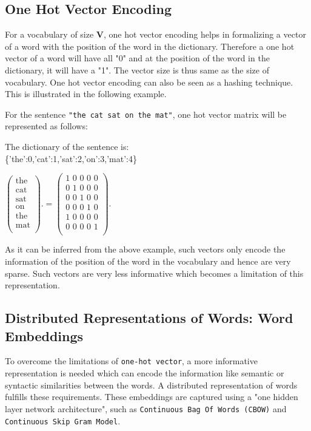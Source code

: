 \subsection{One Hot Vector Encoding}
For a vocabulary of size $\mathbf{V}$, one hot vector encoding helps in formalizing a vector of a word with the position of the word in the dictionary. Therefore a one hot vector of a word will have all "0" and at the position of the word in the dictionary, it will have a "1". The vector size is thus same as the size of vocabulary.
One hot vector encoding can also be seen as a hashing technique. This is illustrated in the following example.
\begin{center}
	For  the sentence \texttt{"the cat sat on the mat"}, one hot vector matrix will be represented as follows:
\end{center}
\begin{center}
	The dictionary of the sentence is:\\
	\{'the':0,'cat':1,'sat':2,'on':3,'mat':4\}\\
\end{center}
\begin{center}
	$\left(
	\begin{array}{ll}
	\text{the} \\
	\text{cat} \\
	\text{sat} \\
	\text{on}  \\ 
	\text{the}  \\ 
	\text{mat}  \\ 
	\end{array}%
	\right). = 
	\left( 
	\begin{array}{ll}
	\text{1 0 0 0 0} \\
	\text{0 1 0 0 0} \\
	\text{0 0 1 0 0} \\
	\text{0 0 0 1 0}  \\ 
	\text{1 0 0 0 0}  \\ 
	\text{0 0 0 0 1}  \\
	\end{array}%
	\right). $
\end{center}
As it can be inferred from the above example, such vectors only encode the information of the position of the word in the vocabulary and hence are very sparse. Such vectors are very less informative which becomes a limitation of this representation.
\subsection{Distributed Representations of Words: Word Embeddings}
To overcome the limitations of \texttt{one-hot vector}, a more informative representation is needed which can encode the information like semantic or syntactic similarities between the words. A distributed representation of words fulfills these requirements. These embeddings are captured using a "one hidden layer network architecture", such as \texttt{Continuous Bag Of Words (CBOW)} and \texttt{Continuous Skip Gram Model}.
